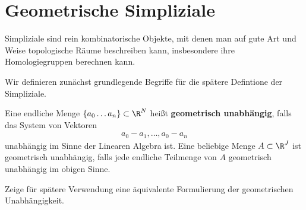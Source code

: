 





\section{Geometrische Simpliziale}

Simpliziale sind rein kombinatorische Objekte, mit denen man auf gute
Art und Weise topologische Räume beschreiben kann, insbesondere ihre
Homologiegruppen berechnen kann.

Wir definieren zunächst grundlegende Begriffe für die spätere
Defintione der Simpliziale.
\begin{Def}
  \label{def:1}
  Eine endliche Menge $\{ a_0\ldots a_n \} \subset \R^N$ heißt
  \textbf{geometrisch unabhängig}, falls das System von Vektoren
  \begin{gather*}
    a_0 - a_1 , \ldots , a_0 - a_n
  \end{gather*}
  unabhängig im Sinne der Linearen Algebra ist. Eine beliebige Menge
  $A \subset \R^J$ ist geometrisch unabhängig, falls jede endliche
  Teilmenge von $A$ geometrisch unabhängig im obigen Sinne.
\end{Def}

Zeige für spätere Verwendung eine äquivalente Formulierung der
geometrischen Unabhängigkeit.

